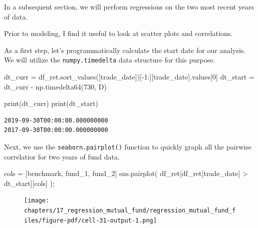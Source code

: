 \documentclass[
  letterpaper,
  DIV=11,
  numbers=noendperiod]{scrreprt}
\newenvironment{Shaded}{\begin{snugshade}}{\end{snugshade}}
\newcommand{\BuiltInTok}[1]{\textcolor[rgb]{0.00,0.23,0.31}{#1}}
\newcommand{\DecValTok}[1]{\textcolor[rgb]{0.68,0.00,0.00}{#1}}
\newcommand{\NormalTok}[1]{\textcolor[rgb]{0.00,0.23,0.31}{#1}}
\newcommand{\OperatorTok}[1]{\textcolor[rgb]{0.37,0.37,0.37}{#1}}
\newcommand{\StringTok}[1]{\textcolor[rgb]{0.13,0.47,0.30}{#1}}
\begin{document}
In a subsequent section, we will perform regressions on the two most
recent years of data.

Prior to modeling, I find it useful to look at scatter plots and
correlations.

As a first step, let's programmatically calculate the start date for our
analysis. We will utilize the \texttt{numpy.timedelta} data structure
for this purpose.

\begin{Shaded}
\begin{Highlighting}[]
\NormalTok{dt\_curr }\OperatorTok{=}\NormalTok{ df\_ret.sort\_values([}\StringTok{\textquotesingle{}trade\_date\textquotesingle{}}\NormalTok{])[}\OperatorTok{{-}}\DecValTok{1}\NormalTok{:][}\StringTok{\textquotesingle{}trade\_date\textquotesingle{}}\NormalTok{].values[}\DecValTok{0}\NormalTok{]}
\NormalTok{dt\_start }\OperatorTok{=}\NormalTok{ dt\_curr }\OperatorTok{{-}}\NormalTok{ np.timedelta64(}\DecValTok{730}\NormalTok{, }\StringTok{\textquotesingle{}D\textquotesingle{}}\NormalTok{)}

\BuiltInTok{print}\NormalTok{(dt\_curr)}
\BuiltInTok{print}\NormalTok{(dt\_start)}
\end{Highlighting}
\end{Shaded}

\begin{verbatim}
2019-09-30T00:00:00.000000000
2017-09-30T00:00:00.000000000
\end{verbatim}

Next, we use the \texttt{seaborn.pairplot()} function to quickly graph
all the pairwise correlatior for two years of fund data.

\begin{Shaded}
\begin{Highlighting}[]
\NormalTok{cols }\OperatorTok{=}\NormalTok{ [}\StringTok{\textquotesingle{}benchmark\textquotesingle{}}\NormalTok{, }\StringTok{\textquotesingle{}fund\_1\textquotesingle{}}\NormalTok{, }\StringTok{\textquotesingle{}fund\_2\textquotesingle{}}\NormalTok{]}
\NormalTok{sns.pairplot(}
\NormalTok{    df\_ret[df\_ret[}\StringTok{\textquotesingle{}trade\_date\textquotesingle{}}\NormalTok{] }\OperatorTok{\textgreater{}}\NormalTok{ dt\_start][cols]}
\NormalTok{)}\OperatorTok{;}
\end{Highlighting}
\end{Shaded}

\begin{figure}[H]

{\centering \texttt{[image: chapters/17\_regression\_mutual\_fund/regression\_mutual\_fund\_files/figure-pdf/cell-31-output-1.png]}

}

\end{figure}
\end{document}
